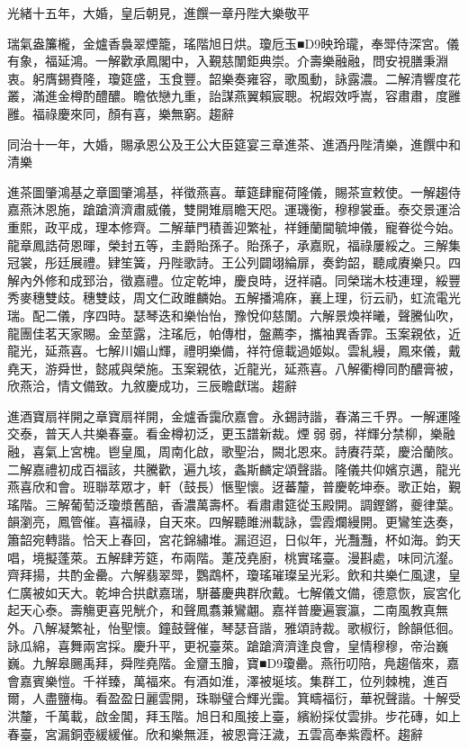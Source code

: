 \begin{pinyinscope}
光緒十五年，大婚，皇后朝見，進饌一章丹陛大樂敬平

瑞氣盎簾櫳，金爐香裊翠煙籠，瑤階旭日烘。瓊卮玉■D9映玲瓏，奉斝侍深宮。儀有象，福延鴻。一解歡承鳳閣中，入覲慈闈鉅典崇。介壽樂融融，問安視膳秉淵衷。躬膺錫賚隆，瓊筵盛，玉食豐。韶樂奏雍容，歌風動，詠露濃。二解清響度花叢，滿進金樽酌醴醲。瞻依戀九重，詒謀燕翼賴宸聰。祝嘏效呼嵩，容肅肅，度雝雝。福祿慶來同，顏有喜，樂無窮。趨辭

同治十一年，大婚，賜承恩公及王公大臣筵宴三章進茶、進酒丹陛清樂，進饌中和清樂

進茶圖肇鴻基之章圖肇鴻基，祥徵燕喜。華筵肆寵荷隆儀，賜茶宣敕使。一解趨侍嘉燕沐恩施，蹌蹌濟濟肅威儀，雙開雉扇瞻天咫。運璣衡，穆穆裳垂。泰交景運洽重熙，政平成，理本修齊。二解華門積善迎繁祉，祥鍾蘭閫毓坤儀，寵眷從今始。龍章鳳誥荷恩暉，榮封五等，圭爵貽孫子。貽孫子，承嘉貺，福祿屢綏之。三解集冠裳，彤廷展禮。肄笙簧，丹陛歌詩。王公列闢翊綸扉，奏鈞韶，聽咸賡樂只。四解內外修和成郅治，徵嘉禮。位定乾坤，慶良時，迓祥禧。同榮瑞木枝連理，綏豐秀麥穗雙歧。穗雙歧，周文仁政雎麟始。五解播鴻庥，襄上理，衍云礽，虹流電光瑞。配二儀，序四時。瑟琴迭和樂怡怡，豫悅仰慈闈。六解景煥祥曦，聲騰仙吹，龍團佳茗天家賜。金莖露，注瑤卮，帕傳柑，盤薦李，攜袖異香霏。玉案親依，近龍光，延燕喜。七解川媚山輝，禮明樂備，祥符億載過姬姒。雲糺縵，鳳來儀，戴堯天，游舜世，懿戚與榮施。玉案親依，近龍光，延燕喜。八解衢樽同酌醲膏被，欣燕洽，情文備致。九敘慶成功，三辰瞻獻瑞。趨辭

進酒寶扇祥開之章寶扇祥開，金爐香靄欣嘉會。永錫詩諧，春滿三千界。一解運隆交泰，普天人共樂春臺。看金樽初泛，更玉譜新裁。煙弱弱，祥輝分禁柳，樂融融，喜氣上宮槐。鬯皇風，周南化啟，歌聖治，闕北恩來。詩賡荇菜，慶洽蘭陔。二解嘉禮初成百福該，共騰歡，遍九垓，螽斯麟定頌聲諧。隆儀共仰嬪京邁，龍光燕喜欣和會。班聯萃眾才，軒（鼓長）愜聖懷。迓蕃釐，普慶乾坤泰。歌正始，覲瑤階。三解葡萄泛瓊漿舊醅，香濃萬壽杯。看肅肅筵從玉殿開。調鏗鏘，夔律葉。韻瀏亮，鳳管催。喜福祿，自天來。四解聽雎洲載詠，雲霞爛縵開。更鸞笙迭奏，簫韶宛轉諧。恰天上春回，宮花錦繡堆。漏迢迢，日似年，光灩灩，杯如海。鈞天唱，境擬蓬萊。五解肆芳筵，布兩階。萐茂堯廚，桃實瑤臺。漫斟處，味同沆瀣。齊拜揚，共酌金罍。六解翡翠斝，鸚鵡杯，瓊瑤璀璨呈光彩。飲和共樂仁風逮，皇仁廣被如天大。乾坤合拱獻嘉瑞，駢蕃慶典群欣戴。七解儀文備，德意恢，宸宮化起天心泰。壽觴更喜兕觥介，和聲鳳翥兼鸞翽。嘉祥普慶遍寰瀛，二南風教真無外。八解凝繁祉，怡聖懷。鐘鼓聲催，琴瑟音諧，雅頌詩裁。歌椒衍，餘韻低徊。詠瓜綿，喜舞兩宮採。慶升平，更祝臺萊。蹌蹌濟濟逢良會，皇情穆穆，帝治巍巍。九解皋颺禹拜，舜陛堯階。金齏玉膾，寶■D9瓊罍。燕衎叨陪，鳧趨偕來，嘉會嘉賓樂愷。千祥臻，萬福來。有酒如淮，澤被埏垓。集群工，位列棘槐，進百爾，人盡鹽梅。看盈盈日麗雲開，珠聯璧合輝光靄。箕疇福衍，華祝聲諧。十解受洪釐，千萬載，啟金閶，拜玉階。旭日和風接上臺，繽紛採仗雲排。步花磚，如上春臺，宮漏銅壺緩緩催。欣和樂無涯，被恩膏汪濊，五雲高奉紫霞杯。趨辭


\end{pinyinscope}
